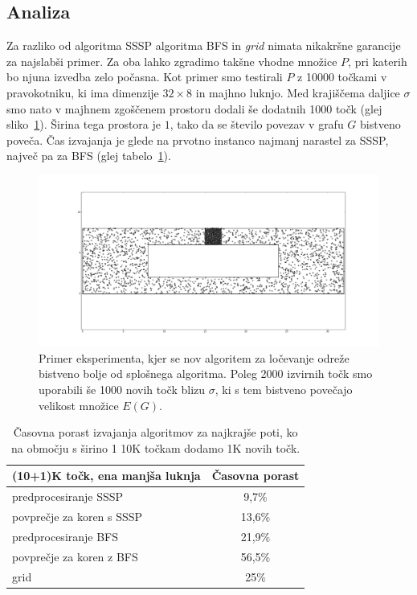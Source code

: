 \documentclass[a4paper, 12pt]{book}
\begin{document}
\subsection{Analiza}
\label{analiza}

Za razliko od algoritma SSSP algoritma BFS in \textit{grid} nimata nikakršne garancije za najslabši primer. Za oba lahko zgradimo takšne vhodne množice $P$, pri katerih bo njuna izvedba zelo počasna. Kot primer smo testirali $P$ z 10000 točkami v pravokotniku, ki ima dimenzije $32\times 8$ in majhno luknjo. Med krajiščema daljice $\sigma$ smo nato v majhnem zgoščenem prostoru dodali še dodatnih 1000 točk (glej sliko~\ref{sep-stuffed}). Širina tega prostora je $1$, tako da se število povezav v grafu $G$ bistveno poveča. Čas izvajanja je glede na prvotno instanco najmanj narastel za SSSP, največ pa za BFS (glej tabelo~\ref{table-increase}).

\begin{figure}[htp]
\centerline{\includegraphics[scale=0.3]{pics/32-1-5000-stuffed.png}}
\caption{Primer eksperimenta, kjer se nov algoritem za ločevanje odreže bistveno bolje od splošnega algoritma. Poleg 2000 izvirnih točk smo uporabili še 1000 novih točk blizu $\sigma$, ki s tem bistveno povečajo velikost množice $E(G)$.}
\label{sep-stuffed}
\end{figure}

\begin{table}[htp]
\begin{center}
\begin{tabular}{l*{1}{c}}
(10+1)K točk, ena manjša luknja & \multicolumn{1}{c}{Časovna porast} \\
\hline
predprocesiranje SSSP &	9,7\%		\\
povprečje za koren s SSSP &	13,6\%	\\
predprocesiranje BFS & 21,9\%	\\
povprečje za koren z BFS &	56,5\% \\
grid &	25\%
\end{tabular}
\caption{Časovna porast izvajanja algoritmov za najkrajše poti, ko na območju s širino 1 10K točkam dodamo 1K novih točk.}
\label{table-increase}
\end{center}
\end{table}
\end{document}

